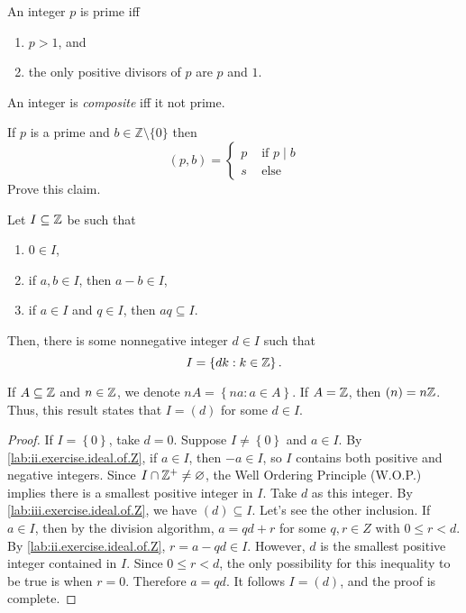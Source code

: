 \documentclass[11pt,a5paper]{article}
\begin{document}
\begin{defi}
    An integer \(p\) is prime iff 
    \begin{enumerate}[label=(\roman*)]
        \item \(p>1\), and
        \item the only positive divisors of \(p\) are \(p\) and \(1\).
    \end{enumerate}
    An integer is \textit{composite} iff it not prime.
\end{defi}


\begin{rem}
    If $p$ is a prime and $b \in \mathbb{Z}\setminus \{0\}$ then
\[
(p, b)= \begin{cases}p & \text { if } p \mid b \\ s & \text { else }\end{cases}
\]
Prove this claim.
\end{rem}

\begin{prop}
    Let \(I\subseteq \mathbb{Z}\) be such that 
    \begin{enumerate}[label=(\roman*)]
        \item \(0\in I\),
        \item\label{lab:ii.exercise.ideal.of.Z} if  \(a,b\in I\), then \(a-b\in I\), 
        \item\label{lab:iii.exercise.ideal.of.Z} if \(a\in I\) and \(q\in I\), then  \(aq\subseteq I\).
    \end{enumerate}
    Then, there is some nonnegative integer \(d\in I\) such that  \[I = \left\{ dk: k \in \mathbb{Z} \right\}.\]
\end{prop}

\begin{rem}
    If \(A\subseteq \mathbb{Z}\) and \(n\in \mathbb{Z}\), we denote 
    \(nA = \left\{n a : a\in A \right\}\).
    If \(A=\mathbb{Z}\), then \((n) = n\mathbb{Z}\).
    Thus, this result states that \(I=(d)\) for some \(d\in I\).
\end{rem}

\begin{proof}
   If \(I = \left\{ 0 \right\}\), take \(d=0\).
   Suppose \(I\neq \left\{ 0 \right\}\)  and \(a\in I\). 
   By \ref{lab:ii.exercise.ideal.of.Z}, 
   if \(a\in I\), then \(-a\in I\), so \(I\) contains both positive and negative integers.
   Since \(I\cap \mathbb{Z}^+\neq \varnothing\), the Well Ordering Principle (W.O.P.) implies there is a smallest positive integer in \(I\).
    Take \(d\) as this  integer.
    By \ref{lab:iii.exercise.ideal.of.Z}, we have \((d)\subseteq I\).
    Let's see the other inclusion.
    If \(a\in I\), then by the division algorithm, \(a=qd+r\) for some \(q,r\in Z\) with \(0\leq r < d\).
    By \ref{lab:ii.exercise.ideal.of.Z}, \(r=a-qd\in I\).
    However, \(d\)  is the smallest positive integer contained in \(I\).
    Since \(0\leq r <d\), the only possibility for this inequality to be true is when  \(r=0\).
    Therefore \(a=qd\).
    It follows \(I =  (d)\), and the proof is complete.
\end{proof}
\end{document}
